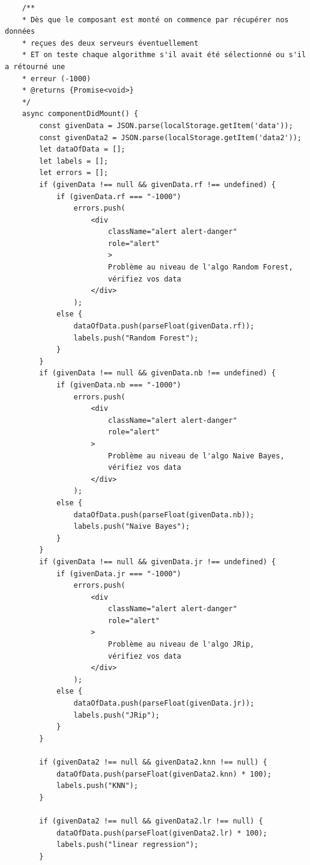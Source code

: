 \documentclass[a4paper,11pt]{article}
\begin{document}
\begin{itemize}
\begin{itemize}
\begin{verbatim}
    /**
    * Dès que le composant est monté on commence par récupérer nos données
    * reçues des deux serveurs éventuellement
    * ET on teste chaque algorithme s'il avait été sélectionné ou s'il a rétourné une
    * erreur (-1000)
    * @returns {Promise<void>}
    */
    async componentDidMount() {
        const givenData = JSON.parse(localStorage.getItem('data'));
        const givenData2 = JSON.parse(localStorage.getItem('data2'));
        let dataOfData = [];
        let labels = [];
        let errors = [];
        if (givenData !== null && givenData.rf !== undefined) {
            if (givenData.rf === "-1000")
                errors.push(
                    <div
                        className="alert alert-danger"
                        role="alert"
                        >
                        Problème au niveau de l'algo Random Forest,
                        vérifiez vos data
                    </div>
                );
            else {
                dataOfData.push(parseFloat(givenData.rf));
                labels.push("Random Forest");
            }
        }
        if (givenData !== null && givenData.nb !== undefined) {
            if (givenData.nb === "-1000")
                errors.push(
                    <div
                        className="alert alert-danger"
                        role="alert"
                    >
                        Problème au niveau de l'algo Naive Bayes,
                        vérifiez vos data
                    </div>
                );
            else {
                dataOfData.push(parseFloat(givenData.nb));
                labels.push("Naive Bayes");
            }
        }
        if (givenData !== null && givenData.jr !== undefined) {
            if (givenData.jr === "-1000")
                errors.push(
                    <div
                        className="alert alert-danger"
                        role="alert"
                    >
                        Problème au niveau de l'algo JRip,
                        vérifiez vos data
                    </div>
                );
            else {
                dataOfData.push(parseFloat(givenData.jr));
                labels.push("JRip");
            }
        }

        if (givenData2 !== null && givenData2.knn !== null) {
            dataOfData.push(parseFloat(givenData2.knn) * 100);
            labels.push("KNN");
        }

        if (givenData2 !== null && givenData2.lr !== null) {
            dataOfData.push(parseFloat(givenData2.lr) * 100);
            labels.push("linear regression");
        }


\end{verbatim}
\end{itemize}
\end{itemize}
\end{document}
